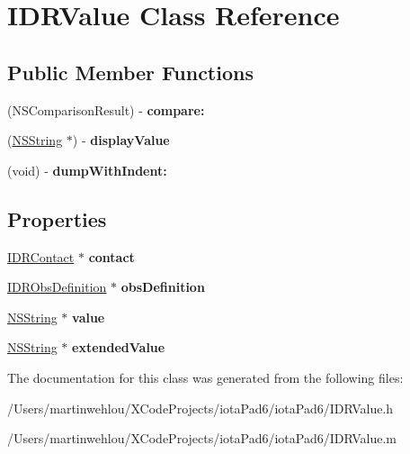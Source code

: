 \hypertarget{interface_i_d_r_value}{
\section{IDRValue Class Reference}
\label{interface_i_d_r_value}
}
\subsection*{Public Member Functions}
\begin{DoxyCompactItemize}
\item 
\hypertarget{interface_i_d_r_value_ad9f8dfd4e047beb95a0364fabedd5840}{
(NSComparisonResult) -\/ {\bfseries compare:}}
\label{interface_i_d_r_value_ad9f8dfd4e047beb95a0364fabedd5840}

\item 
\hypertarget{interface_i_d_r_value_a24ae8f0ec260376d96c980e435ef52c5}{
(\hyperlink{class_n_s_string}{NSString} $\ast$) -\/ {\bfseries displayValue}}
\label{interface_i_d_r_value_a24ae8f0ec260376d96c980e435ef52c5}

\item 
\hypertarget{interface_i_d_r_value_aec5a95674abe755f8c9b65b68c0f3f2c}{
(void) -\/ {\bfseries dumpWithIndent:}}
\label{interface_i_d_r_value_aec5a95674abe755f8c9b65b68c0f3f2c}

\end{DoxyCompactItemize}
\subsection*{Properties}
\begin{DoxyCompactItemize}
\item 
\hypertarget{interface_i_d_r_value_ad5eb2ae49bc43fb1a3a4ff8a9f328337}{
\hyperlink{interface_i_d_r_contact}{IDRContact} $\ast$ {\bfseries contact}}
\label{interface_i_d_r_value_ad5eb2ae49bc43fb1a3a4ff8a9f328337}

\item 
\hypertarget{interface_i_d_r_value_a2b648a3e17d99823cf35bcb020b25578}{
\hyperlink{interface_i_d_r_obs_definition}{IDRObsDefinition} $\ast$ {\bfseries obsDefinition}}
\label{interface_i_d_r_value_a2b648a3e17d99823cf35bcb020b25578}

\item 
\hypertarget{interface_i_d_r_value_aed86fe860a5a9cff711bd928d5199877}{
\hyperlink{class_n_s_string}{NSString} $\ast$ {\bfseries value}}
\label{interface_i_d_r_value_aed86fe860a5a9cff711bd928d5199877}

\item 
\hypertarget{interface_i_d_r_value_adb8315f097155e46f52462adcff5052c}{
\hyperlink{class_n_s_string}{NSString} $\ast$ {\bfseries extendedValue}}
\label{interface_i_d_r_value_adb8315f097155e46f52462adcff5052c}

\end{DoxyCompactItemize}


The documentation for this class was generated from the following files:\begin{DoxyCompactItemize}
\item 
/Users/martinwehlou/XCodeProjects/iotaPad6/iotaPad6/IDRValue.h\item 
/Users/martinwehlou/XCodeProjects/iotaPad6/iotaPad6/IDRValue.m\end{DoxyCompactItemize}
